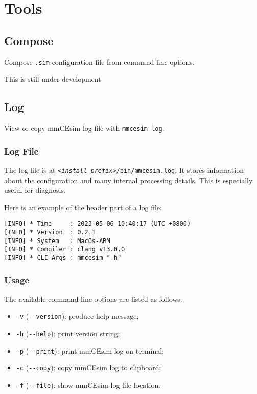 \section{Tools}

\subsection{Compose}

Compose \texttt{.sim} configuration file from command line options.
\begin{tip}[Note]
  This is still under development
\end{tip}

\subsection{Log}
View or copy mmCEsim log file with \texttt{mmcesim-log}.

\subsubsection{Log File}
The log file is at \texttt{\textit{<install\_prefix>}/bin/mmcesim.log}.
It stores information about the configuration and many internal processing details.
This is especially useful for diagnosis.

Here is an example of the header part of a log file:
\begin{lstlisting}
[INFO] * Time     : 2023-05-06 10:40:17 (UTC +0800)
[INFO] * Version  : 0.2.1
[INFO] * System   : MacOs-ARM
[INFO] * Compiler : clang v13.0.0
[INFO] * CLI Args : mmcesim "-h"
\end{lstlisting}

\subsubsection{Usage}
The available command line options are listed as follows:
\begin{itemize}
  \item
    \texttt{-v}
    (\texttt{-{}-version}):
    produce help message;
  \item
    \texttt{-h}
    (\texttt{-{}-help}):
    print version string;
  \item
    \texttt{-p}
    (\texttt{-{}-print}):
    print mmCEsim log on terminal;
  \item
    \texttt{-c}
    (\texttt{-{}-copy}):
    copy mmCEsim log to clipboard;
  \item
    \texttt{-f}
    (\texttt{-{}-file}):
    show mmCEsim log file location.
\end{itemize}


